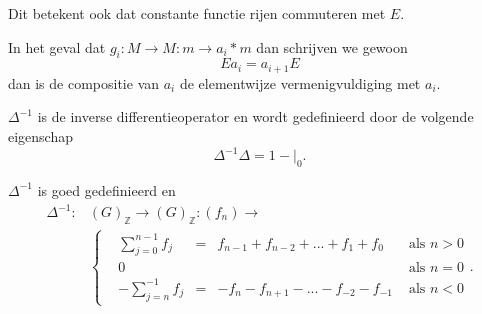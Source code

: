 \documentclass[a4paper,12pt]{article}
\begin{document}
\begin{corollary}\label{constante functie rijen commuteren met E}
    Dit betekent ook dat constante functie rijen commuteren met $E$.
\end{corollary}


\begin{notation}
    In het geval dat $g_i:M \rightarrow M : m \rightarrow a_i*m$ dan schrijven we gewoon
    $$
        Ea_i = a_{i+1}E
    $$
    dan is de compositie van $a_i$ de elementwijze vermenigvuldiging met $a_i$.
\end{notation}


\begin{definition}[$\Delta^{-1}$]
    $\Delta^{-1}$ is de inverse differentieoperator en wordt gedefinieerd door de volgende eigenschap
    $$
        \Delta^{-1} \Delta = 1 -|_0.
    $$
\end{definition}

\begin{theorem}
    $\Delta^{-1}$ is goed gedefinieerd en
    \begin{align*}
        \Delta^{-1} : & (G)_{\mathbb{Z}} \rightarrow (G)_{\mathbb{Z}}: (f_n) \rightarrow                              \\
                      & \left\{\begin{aligned}
                                    & \sum_{j=0}^{n-1}{f_{j}} & = & f_{n-1}+f_{n-2}+...+f_1 +f_0     & \text{ als } n > 0 \\
                                    & 0                       &   &                                  & \text{ als } n = 0 \\
                                    & -\sum_{j=n}^{-1}{f_{j}} & = & -f_{n}-f_{n+1}-...-f_{-2}-f_{-1} & \text{ als } n < 0
                               \end{aligned} \right. .
    \end{align*}
\end{theorem}
\end{document}
